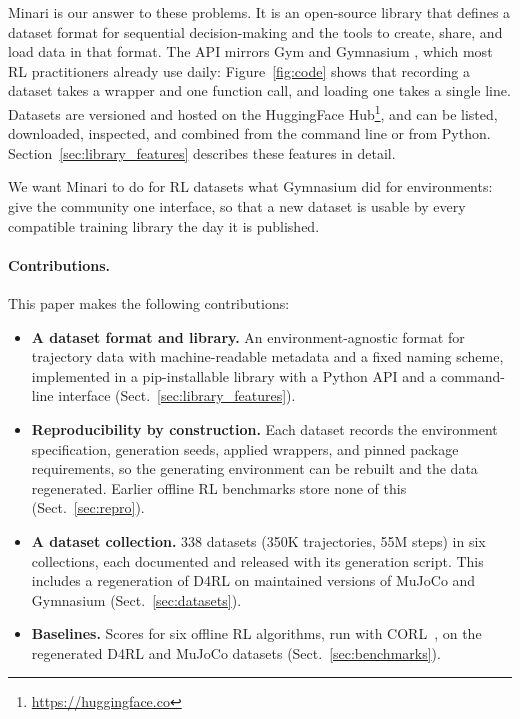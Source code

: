 \documentclass{article}
\newcommand{\numdatasets}{338\xspace}
\newcommand{\numtrajectories}{350K\xspace}
\newcommand{\numsteps}{55M\xspace}
\begin{document}
Minari is our answer to these problems. It is an open-source library that defines a dataset format for sequential decision-making and the tools to create, share, and load data in that format. The API mirrors Gym and Gymnasium \citep{gym, gymnasium}, which most RL practitioners already use daily: Figure~\ref{fig:code} shows that recording a dataset takes a wrapper and one function call, and loading one takes a single line. Datasets are versioned and hosted on the HuggingFace Hub\footnote{\url{https://huggingface.co}}, and can be listed, downloaded, inspected, and combined from the command line or from Python. Section~\ref{sec:library_features} describes these features in detail.

We want Minari to do for RL datasets what Gymnasium did for environments: give the community one interface, so that a new dataset is usable by every compatible training library the day it is published.

\paragraph{Contributions.} This paper makes the following contributions:

\begin{itemize}
    \item \textbf{A dataset format and library.} An environment-agnostic format for trajectory data with machine-readable metadata and a fixed naming scheme, implemented in a pip-installable library with a Python API and a command-line interface (Sect.~\ref{sec:library_features}).
    \item \textbf{Reproducibility by construction.} Each dataset records the environment specification, generation seeds, applied wrappers, and pinned package requirements, so the generating environment can be rebuilt and the data regenerated. Earlier offline RL benchmarks store none of this (Sect.~\ref{sec:repro}).
    \item \textbf{A dataset collection.} \numdatasets datasets (\numtrajectories trajectories, \numsteps steps) in six collections, each documented and released with its generation script. This includes a regeneration of D4RL on maintained versions of MuJoCo and Gymnasium (Sect.~\ref{sec:datasets}).
    \item \textbf{Baselines.} Scores for six offline RL algorithms, run with CORL~\citep{corl}, on the regenerated D4RL and MuJoCo datasets (Sect.~\ref{sec:benchmarks}).
\end{itemize}
\end{document}
